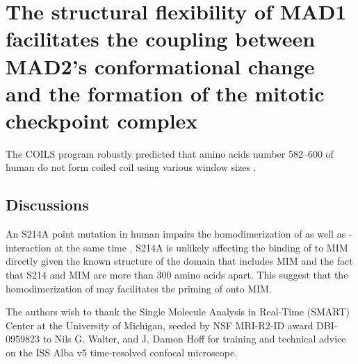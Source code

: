 \chapter{The structural flexibility of MAD1 facilitates the coupling between MAD2's conformational change and the formation of the mitotic checkpoint complex}
\label{chpt:4}
The COILS program robustly predicted that amino acids number 582--600 of human  do not form coiled coil using various window sizes \cite{LupasCOILS}.

\section*{Discussions}

An S214A point mutation in human  impairs the homodimerization of  as well as - interaction at the same time \cite{ATMPhosphorylatesMad1S214}. S214A is unlikely affecting the binding of  to  MIM directly given the known structure of the domain that includes MIM \cite{Structure1GO4} and the fact that S214 and MIM are more than 300 amino acids apart. This suggest that the homodimerization of  may facilitates the priming of  onto  MIM.


The authors wish to thank the Single Molecule Analysis in Real-Time (SMART) Center at the University of Michigan, seeded by NSF MRI-R2-ID award DBI-0959823 to Nils G. Walter, and J. Damon Hoff for training and technical advice on the ISS Alba v5 time-resolved confocal microscope.